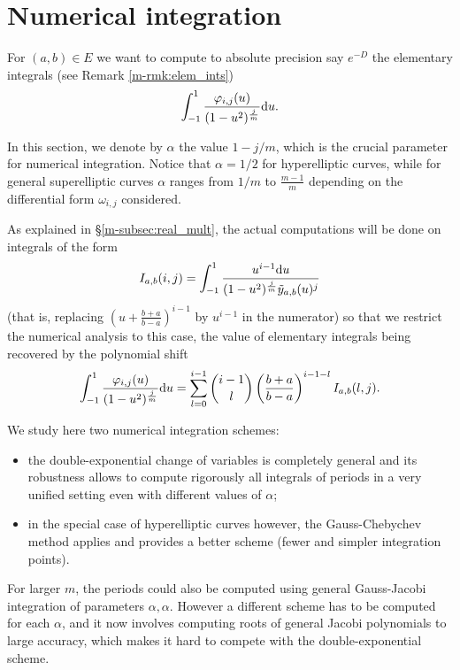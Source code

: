 \documentclass[main.tex]{subfiles}
\begin{document}
  \section{Numerical integration}\label{sec:numerical_integration}

  For $(a,b) \in E$ we want to compute to absolute precision say $e^{-D}$ the elementary integrals
  (see Remark \ref{m-rmk:elem_ints})
\begin{align*}
 \int_{-1}^1 \frac{\varphi_{i,j}(u)}{(1-u^2)^{\frac{j}{m}}}  \mathrm d u.
\end{align*}

In this section, we denote by $α$ the value $1-j/m$, which is the crucial parameter for numerical integration.
Notice that $α=1/2$ for hyperelliptic curves, while for general superelliptic curves $α$ ranges
from $1/m$ to $\frac{m-1}m$ depending on the differential form $\omega_{i,j}$ considered.


As explained in \S \ref{m-subsec:real_mult}, the actual computations will be done on integrals of the form
\begin{equation}
    \label{eq:elem_num_int}
    I_{a,b}(i,j) = \int_{-1}^1\frac{u^{i-1}\mathrm d u}{(1-u^2)^{\frac jm}\tilde{y}_{a,b}(u)^j}
\end{equation}
(that is, replacing $(u+\frac{b+a}{b-a})^{i-1}$ by $u^{i-1}$ in the numerator)
so that we restrict the numerical analysis to this case,
the value of elementary integrals being recovered by the polynomial shift
\begin{equation}
    \label{eq:polshift}
    \int_{-1}^1\frac{\varphi_{i,j}(u)}{(1-u^2)^{\frac jm}}\mathrm d u
    = \sum_{l=0}^{i-1} {i-1 \choose l} \left(\frac{b+a}{b-a}\right)^{i-1-l} I_{a,b}(l,j).
\end{equation}

We study here two numerical integration schemes:
\begin{itemize}
    \item 
        the double-exponential change of variables is completely general \cite{Molin2010} and its robustness
allows to compute rigorously all integrals of periods in a very unified setting
even with different values of $\alpha$;
\item in the special case of hyperelliptic curves however,
    the Gauss-Chebychev method \cite[25.4.38]{AbramowitzStegun} applies and
    provides a better scheme (fewer and simpler integration points).
\end{itemize}
For larger $m$, the periods could also be computed using general Gauss-Jacobi integration
of parameters $\alpha,\alpha$. However a different scheme has to be computed for each $\alpha$,
and it now involves computing roots of general Jacobi polynomials to large accuracy, which
makes it hard to compete with the double-exponential scheme.
\end{document}
